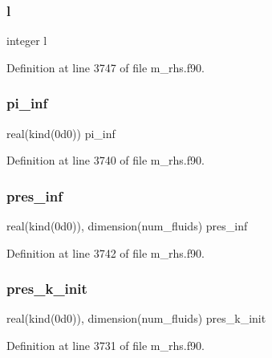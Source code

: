\subsubsection{\texorpdfstring{l}{l}}
{\footnotesize\ttfamily integer l}



Definition at line 3747 of file m\+\_\+rhs.\+f90.

\mbox{\label{m__rhs_8f90_aeed4eb93ccb2725da7a4756e510dda03}} 
\subsubsection{\texorpdfstring{pi\+\_\+inf}{pi\_inf}}
{\footnotesize\ttfamily real(kind(0d0)) pi\+\_\+inf}



Definition at line 3740 of file m\+\_\+rhs.\+f90.

\mbox{\label{m__rhs_8f90_a5e9ec5159360030b214597511982bb81}} 
\subsubsection{\texorpdfstring{pres\+\_\+inf}{pres\_inf}}
{\footnotesize\ttfamily real(kind(0d0)), dimension(num\+\_\+fluids) pres\+\_\+inf}



Definition at line 3742 of file m\+\_\+rhs.\+f90.

\mbox{\label{m__rhs_8f90_a762d1c12479dcf998f8a5a47dc258ddc}} 
\subsubsection{\texorpdfstring{pres\+\_\+k\+\_\+init}{pres\_k\_init}}
{\footnotesize\ttfamily real(kind(0d0)), dimension(num\+\_\+fluids) pres\+\_\+k\+\_\+init}



Definition at line 3731 of file m\+\_\+rhs.\+f90.

